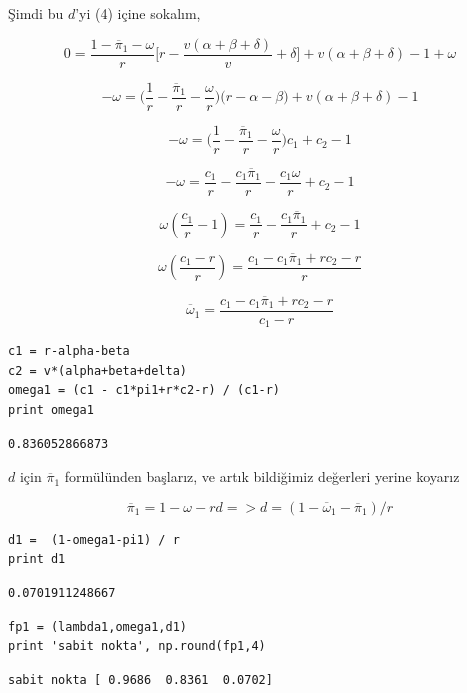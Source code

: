 \documentclass[12pt,fleqn]{article}\usepackage{../../common}
\begin{document}
Şimdi bu $d$'yi (4) içine sokalım,

$$ 
0 =  \frac{1-\overline{\pi}_1-\omega}{r} \bigg[
r - \frac{v (\alpha + \beta + \delta)}{v} + \delta
\bigg] + v (\alpha + \beta + \delta)- 1+\omega
$$

$$ 
-\omega =  \bigg(\frac{1}{r}-\frac{\overline{\pi}_1}{r}-\frac{\omega}{r}\bigg) \bigg(
r - \alpha - \beta 
\bigg) + v (\alpha + \beta + \delta)- 1
$$

$$ 
-\omega =
\bigg(\frac{1}{r}-\frac{\overline{\pi}_1}{r}-\frac{\omega}{r}\bigg)c_1 +
c_2 - 1
$$

$$ 
-\omega = \frac{c_1}{r}-\frac{c_1\overline{\pi}_1}{r}-\frac{c_1 \omega}{r}  +c_2 - 1
$$

$$ 
\omega(\frac{c_1 }{r} -1) = \frac{c_1}{r}-\frac{c_1 \overline{\pi}_1}{r} +c_2 - 1
$$

$$ 
\omega(\frac{c_1-r }{r}) = \frac{c_1 - c_1 \overline{\pi}_1 + rc_2 - r}{r}
$$

$$ 
\overline{\omega}_1 = \frac{c_1 - c_1\overline{\pi}_1 + rc_2 - r}{c_1 - r}
$$

\begin{verbatim}
c1 = r-alpha-beta
c2 = v*(alpha+beta+delta)
omega1 = (c1 - c1*pi1+r*c2-r) / (c1-r)
print omega1
\end{verbatim}

\begin{verbatim}
0.836052866873
\end{verbatim}

$d$ için $\overline{\pi}_1$ formülünden başlarız, ve artık bildiğimiz
değerleri yerine koyarız

$$ \overline{\pi}_1 = 1-\omega-rd => 
d = (1-\overline{\omega}_1 -\overline{\pi}_1) / r $$

\begin{verbatim}
d1 =  (1-omega1-pi1) / r
print d1
\end{verbatim}

\begin{verbatim}
0.0701911248667
\end{verbatim}


\begin{verbatim}
fp1 = (lambda1,omega1,d1)
print 'sabit nokta', np.round(fp1,4)
\end{verbatim}

\begin{verbatim}
sabit nokta [ 0.9686  0.8361  0.0702]
\end{verbatim}
\end{document}
